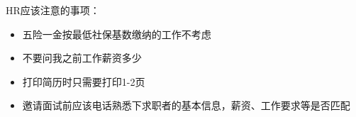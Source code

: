 
HR应该注意的事项：
\begin{itemize}[label=$\ast$] \itemsep-4pt \vspace{-5pt}
  \item 五险一金按最低社保基数缴纳的工作不考虑
  \item 不要问我之前工作薪资多少
  \item 打印简历时只需要打印1-2页
  \item 邀请面试前应该电话熟悉下求职者的基本信息，薪资、工作要求等是否匹配
\end{itemize}